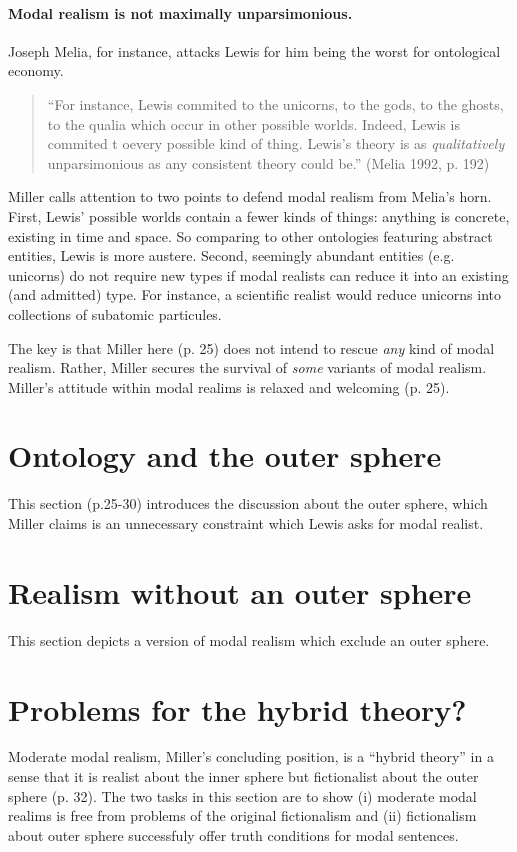 \documentclass[
10pt, %
a4paper, %
twocolumn, %
landscape %
]{article}
\begin{document}
\paragraph{Modal realism is not maximally unparsimonious.}
Joseph Melia, for instance, attacks Lewis for him being the worst for ontological economy.

\begin{quote}
``For instance, Lewis commited to the unicorns, to the gods, to the ghosts, to the qualia which occur in other possible worlds. Indeed, Lewis is commited t oevery possible kind of thing. Lewis's theory is as \textit{qualitatively} unparsimonious as any consistent theory could be.'' (Melia 1992, p. 192)
\end{quote}

Miller calls attention to two points to defend modal realism from Melia's horn.
First, Lewis' possible worlds contain a fewer kinds of things: anything is concrete, existing in time and space.
So comparing to other ontologies featuring abstract entities, Lewis is more austere.
Second, seemingly abundant entities (e.g. unicorns) do not require new types if modal realists can reduce it into an existing (and admitted) type. For instance, a scientific realist would reduce unicorns into collections of subatomic particules.

The key is that Miller here (p. 25) does not intend to rescue \emph{any} kind of modal realism. Rather, Miller secures the survival of \emph{some} variants of modal realism.
Miller's attitude within modal realims is relaxed and welcoming (p. 25).

\section{Ontology and the outer sphere}
This section (p.25-30) introduces the discussion about the outer sphere, which Miller claims is an unnecessary constraint which Lewis asks for modal realist.

\section{Realism without an outer sphere}
This section depicts a version of modal realism which exclude an outer sphere.

\section{Problems for the hybrid theory?}
Moderate modal realism, Miller's concluding position, is a ``hybrid theory'' in a sense that it is realist about the inner sphere but fictionalist about the outer sphere (p. 32). The two tasks in this section are to show (i) moderate modal realims is free from problems of the original fictionalism and (ii) fictionalism about outer sphere successfuly offer truth conditions for modal sentences.
\end{document}
